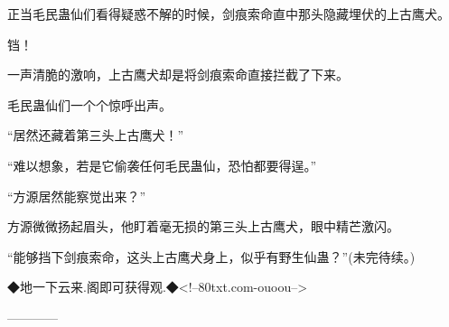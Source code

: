 \begin{this_body}
正当毛民蛊仙们看得疑惑不解的时候，剑痕索命直中那头隐藏埋伏的上古鹰犬。

铛！

一声清脆的激响，上古鹰犬却是将剑痕索命直接拦截了下来。

毛民蛊仙们一个个惊呼出声。

“居然还藏着第三头上古鹰犬！”

“难以想象，若是它偷袭任何毛民蛊仙，恐怕都要得逞。”

“方源居然能察觉出来？”

方源微微扬起眉头，他盯着毫无损的第三头上古鹰犬，眼中精芒激闪。

“能够挡下剑痕索命，这头上古鹰犬身上，似乎有野生仙蛊？”(未完待续。)

◆地一下云来.阁即可获得观.◆<!--80txt.com-ouoou-->

------------

\end{this_body}

